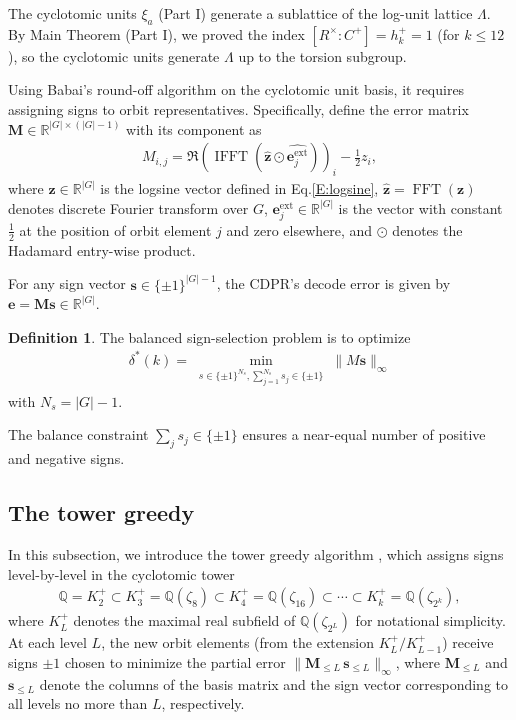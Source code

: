 \documentclass[11pt,a4paper]{article}
\theoremstyle{plain}
\theoremstyle{definition}
\newtheorem{definition}[theorem]{Definition}
\theoremstyle{remark}
\DeclareMathOperator{\FFT}{FFT}
\DeclareMathOperator{\IFFT}{IFFT}
\newcommand{\R}{\mathbb{R}}
\begin{document}
The cyclotomic units $\xi_a$ (Part I) generate a sublattice of the log-unit lattice $\Lambda$. By Main Theorem (Part I), we proved the index $[R^\times:C^+]=h_k^+=1$ (for $k\le 12$), so the cyclotomic units generate $\Lambda$ up to the torsion subgroup.

Using Babai's round-off algorithm on the cyclotomic unit basis, it requires assigning signs to orbit representatives. Specifically, define the error matrix $\mathbf{M}\in\R^{|G|\times(|G|-1)}$ with its component as 
\begin{eqnarray}  M_{i,j}=\Re(\IFFT(\hat{\mathbf{z}}\odot\widehat{\mathbf{e}_j^{\mathrm{ext}}}))_i-\frac{1}{2}z_i,
  \label{E:errormatrix}
\end{eqnarray}
where $\mathbf{z}\in\R^{|G|}$ is the logsine vector defined in Eq.\eqref{E:logsine}, $\hat{\mathbf{z}}=\FFT(\mathbf{z})$ denotes discrete Fourier transform over $G$, $\mathbf{e}_j^{\mathrm{ext}}\in\R^{|G|}$ is the vector with constant $\frac{1}{2}$ at the position of orbit element $j$ and zero elsewhere, and $\odot$ denotes the Hadamard entry-wise product. 

For any sign vector $\mathbf{s}\in\{\pm1\}^{|G|-1}$, the CDPR's decode error is given by $\mathbf{e}=\mathbf{M}\mathbf{s}\in\R^{|G|}$. 

\begin{definition}
\label{D:signprob}
The balanced sign-selection problem is to optimize 
\begin{align}
  \delta^*(k)=\min_{\substack{s\in\{\pm1\}^{N_s},  \sum_{j=1}^{N_s} s_j\in\{\pm1\}}} \|M\mathbf{s}\|_\infty
  \label{E:signprob}
\end{align}
with $N_s=|G|-1$. 

\end{definition}

The balance constraint $\sum_j s_j\in\{\pm 1\}$ ensures a near-equal number of positive and negative signs.

\subsection{The tower greedy} 

In this subsection, we introduce the tower greedy algorithm \cite{CDPR16}, which assigns signs level-by-level in the cyclotomic tower
\begin{align}
\mathbb{Q}=K_2^+ \subset K_3^+=\mathbb{Q}(\zeta_8) \subset K_4^+=\mathbb{Q}(\zeta_{16}) \subset \cdots \subset K_k^+=\mathbb{Q}(\zeta_{2^k}),
\label{E:towergreedy}
\end{align}
where $K_L^+$ denotes the maximal real subfield of $\mathbb{Q}(\zeta_{2^L})$ for notational simplicity. At each level $L$, the new orbit elements (from the extension $K_L^+/K_{L-1}^+$) receive signs $\pm 1$ chosen to minimize the partial error $\|\mathbf{M}_{\le L}\,\mathbf{s}_{\le L}\|_\infty$, where $\mathbf{M}_{\le L}$ and $\mathbf{s}_{\le L}$ denote the columns of the basis matrix and the sign vector corresponding to all levels no more than $L$, respectively.
\end{document}
